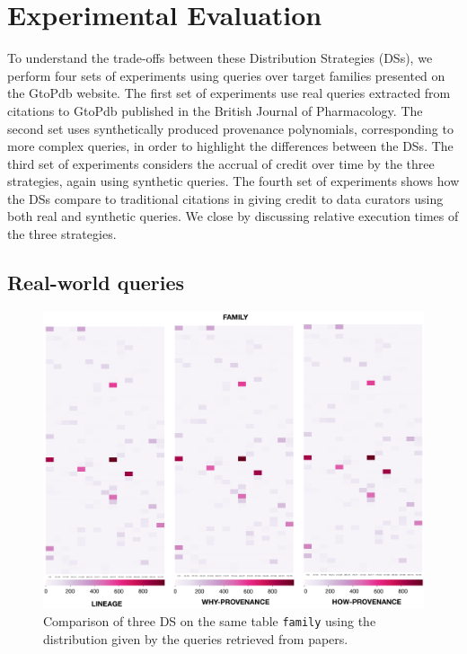 \section{Experimental Evaluation}
\label{sec:experiments}
To understand the trade-offs between these Distribution Strategies (DSs), we perform four sets of experiments using queries over target families presented on the GtoPdb website. The first set of experiments use real queries extracted from citations to GtoPdb published in the British Journal of Pharmacology.  
The second set uses synthetically produced provenance polynomials, corresponding to more complex queries, in order to highlight the differences between the DSs.
The third set of experiments considers the accrual of credit over time by the three strategies, again using synthetic queries.
The fourth set of experiments shows how the DSs compare to traditional citations in giving credit to data curators using both real and synthetic queries. We close by discussing relative execution times of the three strategies.

\subsection{Real-world queries}
\label{sec:real_world_queries}

\begin{figure}[t]
  \includegraphics[width=1\textwidth]{figures/paper_based}
  \caption{Comparison of three DS on the same table \texttt{family} using the distribution given by the queries retrieved from papers.}
  \label{figure:comparison_on_papers}
\end{figure}


